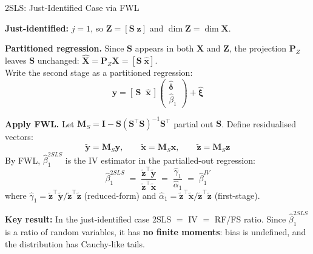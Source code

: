 \documentclass[9pt]{beamer}
\begin{document}
\begin{frame}{2SLS: Just-Identified Case via FWL}

  \textbf{Just-identified:} $j=1$, so $\mathbf{Z}=[\mathbf{S}\;\mathbf{z}]$ and $\dim\mathbf{Z}=\dim\mathbf{X}$.

  \medskip
  \textbf{Partitioned regression.} Since $\mathbf{S}$ appears in both $\mathbf{X}$ and $\mathbf{Z}$, the projection $\mathbf{P}_Z$ leaves $\mathbf{S}$ unchanged: $\hat{\mathbf{X}} = \mathbf{P}_Z\mathbf{X} = [\mathbf{S}\;\hat{\mathbf{x}}]$.\\[4pt]
  Write the second stage as a partitioned regression:
  \[
    \mathbf{y} = [\,\mathbf{S}\;\;\hat{\mathbf{x}}\,]
                 \begin{pmatrix}\hat{\bm{\delta}}\\\hat{\beta}_1\end{pmatrix} + \hat{\bm{\xi}}
  \]

  \medskip
  \textbf{Apply FWL.} Let $\mathbf{M}_S = \mathbf{I} - \mathbf{S}(\mathbf{S}^\top\mathbf{S})^{-1}\mathbf{S}^\top$ partial out $\mathbf{S}$. Define residualised vectors:
  \[
    \tilde{\mathbf{y}} = \mathbf{M}_S\mathbf{y}, \qquad
    \tilde{\mathbf{x}} = \mathbf{M}_S\mathbf{x}, \qquad
    \tilde{\mathbf{z}} = \mathbf{M}_S\mathbf{z}
  \]
  By FWL, $\hat{\beta}_1^{2SLS}$ is the IV estimator in the partialled-out regression:
  \[
    \hat{\beta}_1^{2SLS}
    \;=\; \frac{\tilde{\mathbf{z}}^\top\tilde{\mathbf{y}}}{\tilde{\mathbf{z}}^\top\tilde{\mathbf{x}}}
    \;=\; \frac{\hat{\gamma}_1}{\hat{\alpha}_1}
    \;=\; \hat{\beta}_1^{IV}
  \]
  where $\hat{\gamma}_1 = \tilde{\mathbf{z}}^\top\tilde{\mathbf{y}}/\tilde{\mathbf{z}}^\top\tilde{\mathbf{z}}$ (reduced-form) and $\hat{\alpha}_1 = \tilde{\mathbf{z}}^\top\tilde{\mathbf{x}}/\tilde{\mathbf{z}}^\top\tilde{\mathbf{z}}$ (first-stage).

  \medskip
  \textbf{Key result:} In the just-identified case \textcolor{slideblue}{2SLS $=$ IV $=$ RF/FS ratio}. Since $\hat{\beta}_1^{2SLS}$ is a ratio of random variables, it has \textbf{no finite moments}: bias is undefined, and the distribution has Cauchy-like tails.

\end{frame}
\end{document}
